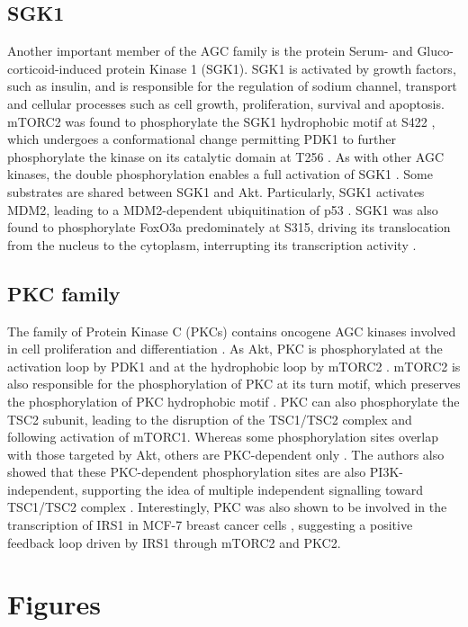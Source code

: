 \subsection{SGK1}
\label{subsubsec:SGK1}
Another important member of the AGC family is the protein Serum- and Gluco-corticoid-induced protein Kinase 1 (SGK1). SGK1 is activated by growth factors, such as insulin, and is responsible for the regulation of sodium channel, transport and cellular processes such as cell growth, proliferation, survival and apoptosis. mTORC2 was found to phosphorylate the SGK1 hydrophobic motif at S422 \citep{Alessi2008}, which undergoes a conformational change permitting PDK1 to further phosphorylate the kinase on its catalytic domain at T256 \citep{Kobayashi1999, Alessi2004}. As with other AGC kinases, the double phosphorylation enables a full activation of SGK1 \citep{Pearce2010}. Some substrates are shared between SGK1 and Akt. Particularly, SGK1 activates MDM2, leading to a MDM2-dependent ubiquitination of p53 \citep{Amato2009}. SGK1 was also found to phosphorylate FoxO3a predominately at S315, driving its translocation from the nucleus to the cytoplasm, interrupting its transcription activity \citep{Brunet2001}.

\subsection{PKC family}
\label{subsec:PKC}
The family of Protein Kinase C (PKCs) contains oncogene AGC kinases involved in cell proliferation and differentiation \citep{Griner2007}. As Akt, PKC is phosphorylated at the activation loop by PDK1 and at the hydrophobic loop by mTORC2 \citep{Ikenoue2008}. mTORC2 is also responsible for the phosphorylation of PKC at its turn motif, which preserves the phosphorylation of PKC hydrophobic motif \citep{Hauge2007, Ikenoue2008}. PKC can also phosphorylate the TSC2 subunit, leading to the disruption of the TSC1/TSC2 complex and following activation of mTORC1. Whereas some phosphorylation sites overlap with those targeted by Akt, others are PKC-dependent only \citep{Tee2003}. The authors also showed that these PKC-dependent phosphorylation sites are also PI3K-independent, supporting the idea of multiple independent signalling toward TSC1/TSC2 complex \citep{Inoki2006}. Interestingly, PKC was also shown to be involved in the transcription of IRS1 in MCF-7 breast cancer cells \citep{deVente1996}, suggesting a 
positive 
feedback loop driven by IRS1 through mTORC2 and PKC2.


\section{Figures}
\label{chap3:Figures}


